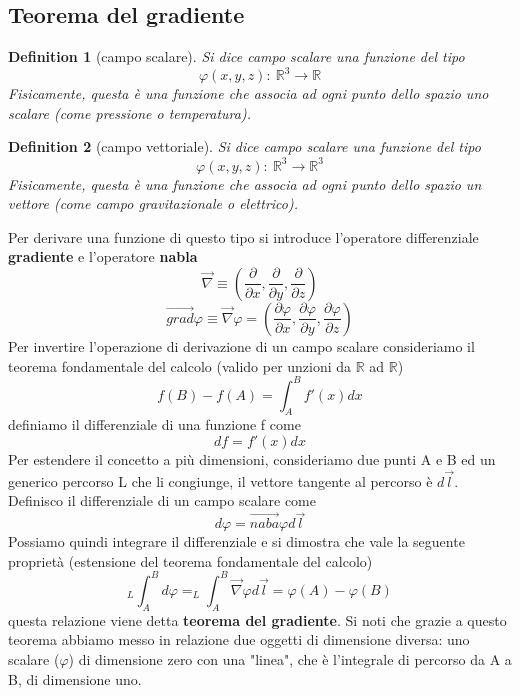 \documentclass[10pt,a4paper]{article}
\newtheorem{definition}{Definition}
\begin{document}
\subsection{Teorema del gradiente}
\begin{definition}[campo scalare]
	Si dice campo scalare una funzione del tipo 
	\[\varphi(x, y, z):\ \mathbb{R}^3\rightarrow \mathbb{R}\]
	Fisicamente, questa è una funzione che associa ad ogni punto dello spazio uno scalare (come pressione o temperatura).
\end{definition}
\begin{definition}[campo vettoriale]
	Si dice campo scalare una funzione del tipo 
	\[\varphi(x, y, z):\ \mathbb{R}^3\rightarrow \mathbb{R}^3\]
	Fisicamente, questa è una funzione che associa ad ogni punto dello spazio un vettore (come campo gravitazionale o elettrico).
\end{definition}
Per derivare una funzione di questo tipo si introduce l'operatore differenziale \textbf{gradiente} e l'operatore \textbf{nabla}
\[\vec{\nabla} \equiv \left(\frac{\partial}{\partial x}, \frac{\partial }{\partial y}, \frac{\partial }{\partial z}\right)\]
\[\vec{grad}\varphi \equiv \vec{\nabla}\varphi = \left(\frac{\partial\varphi }{\partial x}, \frac{\partial\varphi }{\partial y}, \frac{\partial\varphi }{\partial z}\right)\]
Per invertire l'operazione di derivazione di un campo scalare consideriamo il teorema fondamentale del calcolo (valido per unzioni da \(\mathbb{R}\) ad \(\mathbb{R}\))
\[f(B)-f(A) = \int_{A}^{B}f'(x)dx\]
definiamo il differenziale di una funzione f come
\[df = f'(x)dx\] 
Per estendere il concetto a più dimensioni, consideriamo due punti A e B ed un generico percorso L che li congiunge, il vettore tangente al percorso è $d\vec{l}$.  Definisco il differenziale di un campo scalare come 
\[d\varphi = \vec{naba}\varphi d\vec{l}\]
Possiamo quindi integrare il differenziale e si dimostra che vale la seguente proprietà (estensione del teorema fondamentale del calcolo)
\[_L\int_{A}^{B}d\varphi = _L\int_{A}^{B}\vec{\nabla}\varphi d\vec{l} = \varphi(A)-\varphi(B)\]
questa relazione viene detta \textbf{teorema del gradiente}. Si noti che grazie a questo teorema abbiamo messo in relazione due oggetti di dimensione diversa: uno scalare (\(\varphi\)) di dimensione zero con una "linea", che è l'integrale di percorso da A a B, di dimensione uno.
\end{document}

